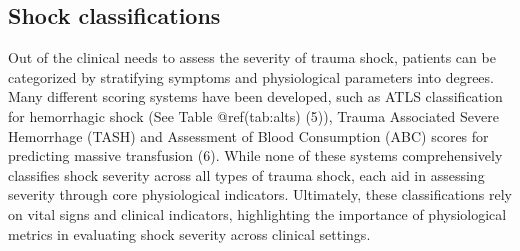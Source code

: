 \documentclass[
]{article}
\begin{document}
\hypertarget{shock-classifications}{%
\subsection{Shock classifications}\label{shock-classifications}}

Out of the clinical needs to assess the severity of trauma shock,
patients can be categorized by stratifying symptoms and physiological
parameters into degrees. Many different scoring systems have been
developed, such as ATLS classification for hemorrhagic shock (See Table
@ref(tab:alts) (5)), Trauma Associated Severe Hemorrhage (TASH) and
Assessment of Blood Consumption (ABC) scores for predicting massive
transfusion (6). While none of these systems comprehensively classifies
shock severity across all types of trauma shock, each aid in assessing
severity through core physiological indicators. Ultimately, these
classifications rely on vital signs and clinical indicators,
highlighting the importance of physiological metrics in evaluating shock
severity across clinical settings.
\end{document}
